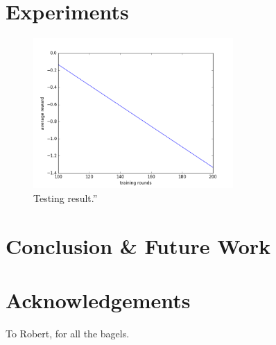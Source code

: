 \documentclass{acmsiggraph}
\begin{document}
\section{Experiments}


\begin{figure}[ht]
  \centering
  \includegraphics[width=3.0in]{../figures/testing.png}
  \caption{Testing result.''}
  \label{fig:ferrari}
\end{figure}


\section{Conclusion \& Future Work}



\section*{Acknowledgements}

To Robert, for all the bagels.


\nocite{*}

\end{document}
